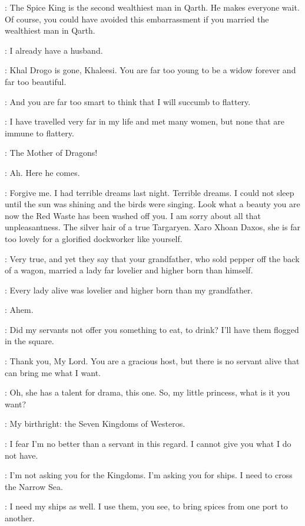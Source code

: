 \XARO: The Spice King is the second wealthiest man in Qarth. He makes everyone wait. Of course, you could have avoided this embarrassment if you married the wealthiest man in Qarth. 

\DAENERYS: I already have a husband. 

\XARO: Khal Drogo is gone, Khaleesi. You are far too young to be a widow forever and far too beautiful. 

\DAENERYS: And you are far too smart to think that I will succumb to flattery. 

\XARO: I have travelled very far in my life and met many women, but none that are immune to flattery. 


\SPICEKING: The Mother of Dragons! 

\XARO: Ah. Here he comes. 

\SPICEKING: Forgive me. I had terrible dreams last night. Terrible dreams. I could not sleep until the sun was shining and the birds were singing. Look what a beauty you are now the Red Waste has been washed off you. I am sorry about all that unpleasantness. The silver hair of a true Targaryen. Xaro Xhoan Daxos, she is far too lovely for a glorified dockworker like yourself. 

\XARO: Very true, and yet they say that your grandfather, who sold pepper off the back of a wagon, married a lady far lovelier and higher born than himself. 

\SPICEKING: Every lady alive was lovelier and higher born than my grandfather. 

\DAENERYS: Ahem. 

\SPICEKING: Did my servants not offer you something to eat, to drink? I'll have them flogged in the square. 

\DAENERYS: Thank you, My Lord. You are a gracious host, but there is no servant alive that can bring me what I want. 

\SPICEKING: Oh, she has a talent for drama, this one. So, my little princess, what is it you want? 

\DAENERYS: My birthright: the Seven Kingdoms of Westeros. 

\SPICEKING: I fear I'm no better than a servant in this regard. I cannot give you what I do not have. 

\DAENERYS: I'm not asking you for the Kingdoms. I'm asking you for ships. I need to cross the Narrow Sea. 

\SPICEKING: I need my ships as well. I use them, you see, to bring spices from one port to another. 

